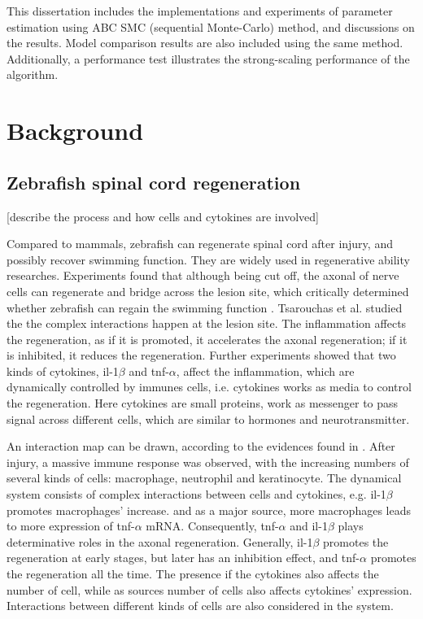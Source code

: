 \documentclass[12pt,a4paper]{report}
\begin{document}
This dissertation includes the implementations and experiments of parameter estimation using ABC SMC (sequential Monte-Carlo) method, and discussions on the results. Model comparison results are also included using the same method. Additionally, a performance test illustrates the strong-scaling performance of the algorithm.








\chapter{Background}

\section{Zebrafish spinal cord regeneration}

 [describe the process and how cells and cytokines are involved]

Compared to mammals, zebrafish can regenerate spinal cord after injury, and possibly recover swimming function. They are widely used in regenerative ability researches. Experiments found that although being cut off, the axonal of nerve cells can regenerate and bridge across the lesion site, which critically determined whether zebrafish can regain the swimming function \cite{axonal}. Tsarouchas et al. \cite{ref:Tsarouchas} studied the the complex interactions happen at the lesion site. The inflammation affects the regeneration, as if it is promoted, it accelerates the axonal regeneration; if it is inhibited, it reduces the regeneration. Further experiments showed that two kinds of cytokines, il-1$\beta$ and tnf-$\alpha$, affect the inflammation, which are dynamically controlled by immunes cells, i.e. cytokines works as media to control the regeneration. Here cytokines are small proteins, work as messenger to pass signal across different cells, which are similar to hormones and neurotransmitter.

An interaction map can be drawn, according to the evidences found in \cite{ref:Tsarouchas}. After injury, a massive immune response was observed, with the increasing numbers of several kinds of cells: macrophage, neutrophil and keratinocyte. The dynamical system consists of complex interactions between cells and cytokines, e.g. il-1$\beta$ promotes macrophages' increase. and as a major source, more macrophages leads to more expression of tnf-$\alpha$ mRNA. Consequently, tnf-$\alpha$ and il-1$\beta$ plays determinative roles in the axonal regeneration. Generally, il-1$\beta$ promotes the regeneration at early stages, but later has an inhibition effect, and tnf-$\alpha$ promotes the regeneration all the time. The presence if the cytokines also affects the number of cell, while as sources number of cells also affects cytokines' expression. Interactions between different kinds of cells are also considered in the system.
\end{document}
